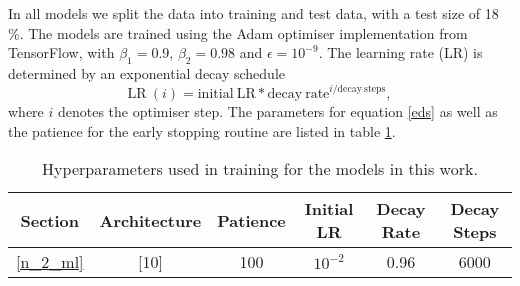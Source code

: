 In all models we split the data into training and test data, with a test size of 18 \%.
The models are trained using the Adam optimiser implementation from TensorFlow, with $\beta_1 = 0.9$, $\beta_2 = 0.98$ and $\epsilon = 10^{-9}$. The learning rate (LR) is determined by an exponential decay schedule
\begin{equation} \label{eds}
	\mathrm{LR} \ (i) = \mathrm{initial \ LR} * \mathrm{decay \ rate} ^{i / \mathrm{decay \ steps}},
\end{equation}
where $i$ denotes the optimiser step. The parameters for equation \ref{eds} as well as the patience for the early stopping routine are listed in table \ref{hyperparams}.

\begin{table}[h]
	\centering
	\begin{tabular}{c | c | c | c | c | c}
		Section & Architecture & Patience & Initial LR & Decay Rate & Decay Steps\\
		\hline
		\ref{n_2_ml} & [10] & 100 & $10^{-2}$ & 0.96 & 6000  \\
	\end{tabular}
	\caption{Hyperparameters used in training for the models in this work.}
	\label{hyperparams}
\end{table}